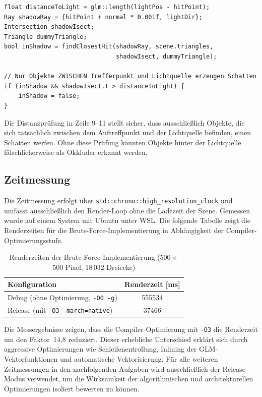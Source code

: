 \documentclass[11pt, a4paper]{article}
\begin{document}
\begin{lstlisting}[caption={Schattenstrahl mit Distanzprüfung}]
float distanceToLight = glm::length(lightPos - hitPoint);
Ray shadowRay = {hitPoint + normal * 0.001f, lightDir};
Intersection shadowIsect;
Triangle dummyTriangle;
bool inShadow = findClosestHit(shadowRay, scene.triangles,
                               shadowIsect, dummyTriangle);

// Nur Objekte ZWISCHEN Trefferpunkt und Lichtquelle erzeugen Schatten
if (inShadow && shadowIsect.t > distanceToLight) {
    inShadow = false;
}
\end{lstlisting}

Die Distanzprüfung in Zeile 9--11 stellt sicher, dass ausschließlich Objekte, die sich tatsächlich zwischen dem Auftreffpunkt und der Lichtquelle befinden, einen Schatten werfen. Ohne diese Prüfung könnten Objekte hinter der Lichtquelle fälschlicherweise als Okkluder erkannt werden.

\subsection{Zeitmessung}

Die Zeitmessung erfolgt über \texttt{std::chrono::high\_resolution\_clock} und umfasst ausschließlich den Render-Loop ohne die Ladezeit der Szene. Gemessen wurde auf einem System mit Ubuntu unter WSL. Die folgende Tabelle zeigt die Renderzeiten für die Brute-Force-Implementierung in Abhängigkeit der Compiler-Optimierungsstufe.

\begin{table}[H]
    \centering
    \caption{Renderzeiten der Brute-Force-Implementierung (500\,$\times$\,500 Pixel, 18\,032 Dreiecke)}
    \label{tab:zeiten-aufgabe1}
    \begin{tabular}{l S[table-format=6.0]}
        \toprule
        \textbf{Konfiguration} & {\textbf{Renderzeit [ms]}} \\
        \midrule
        Debug (ohne Optimierung, \texttt{-O0 -g})  & 555534 \\
        Release (mit \texttt{-O3 -march=native})    &  37466 \\
        \bottomrule
    \end{tabular}
\end{table}

Die Messergebnisse zeigen, dass die Compiler-Optimierung mit \texttt{-O3} die Renderzeit um den Faktor~14,8 reduziert. Dieser erhebliche Unterschied erklärt sich durch aggressive Optimierungen wie Schleifenentrollung, Inlining der GLM-Vektorfunktionen und automatische Vektorisierung. Für alle weiteren Zeitmessungen in den nachfolgenden Aufgaben wird ausschließlich der Release-Modus verwendet, um die Wirksamkeit der algorithmischen und architekturellen Optimierungen isoliert bewerten zu können.
\end{document}
